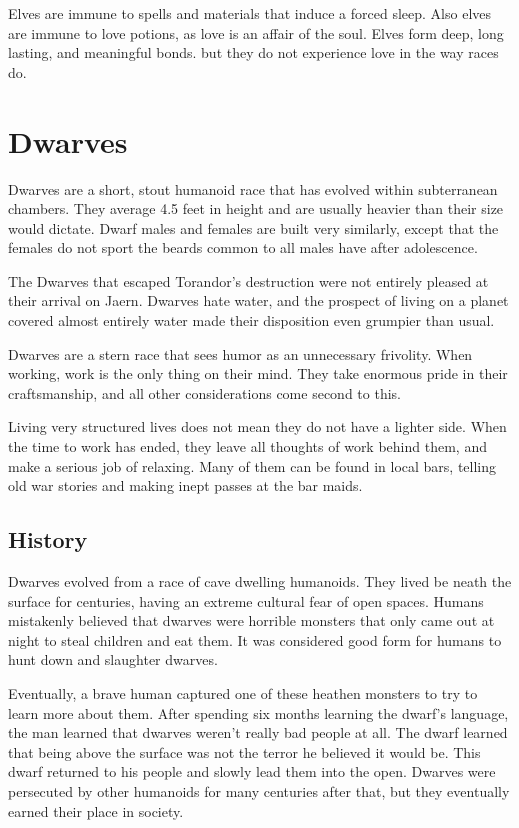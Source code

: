 \begin{multicols*}{2}
Elves are immune to spells and materials that induce a forced sleep. Also elves are immune to love potions, as love is an affair of the soul. Elves form deep, long lasting, and meaningful bonds. but they do not experience love in the way races do.
\makeline
\section{Dwarves}
Dwarves are a short, stout humanoid race that has evolved within subterranean chambers. They average 4.5 feet in height and are usually heavier than their size would dictate. Dwarf males and females are built very similarly, except that the females do not sport the beards common to all males have after adolescence.

The Dwarves that escaped Torandor's destruction were not entirely pleased at their arrival on Jaern. Dwarves hate water, and the prospect of living on a planet covered almost entirely water made their disposition even grumpier than usual.

Dwarves are a stern race that sees humor as an unnecessary frivolity. When working, work is the only thing on their mind. They take enormous pride in their craftsmanship, and all other considerations come second to this.

Living very structured lives does not mean they do not have a lighter side. When the time to work has ended, they leave all thoughts of work behind them, and make a serious job of relaxing. Many of them can be found in local bars, telling old war stories and making inept passes at the bar maids.
\subsection{History}
Dwarves evolved from a race of cave dwelling humanoids. They lived be neath the surface for centuries, having an extreme cultural fear of open spaces. Humans mistakenly believed that dwarves were horrible monsters that only came out at night to steal children and eat them. It was considered good form for humans to hunt down and slaughter dwarves.

Eventually, a brave human captured one of these heathen monsters to try to learn more about them. After spending six months learning the dwarf's language, the man learned that dwarves weren't really bad people at all. The dwarf learned that being above the surface was not the terror he believed it would be. This dwarf returned to his people and slowly lead them into the open. Dwarves were persecuted by other humanoids for many centuries after that, but they eventually earned their place in society.

\end{multicols*}
